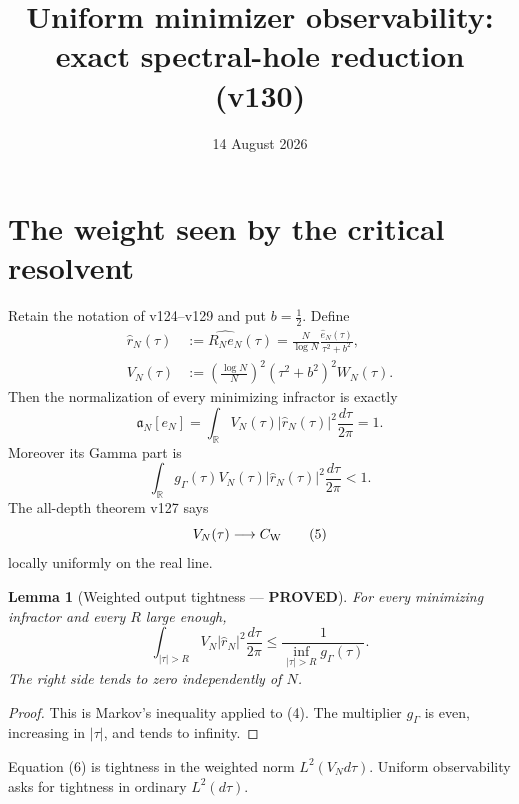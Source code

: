 \documentclass[11pt]{article}
\title{Uniform minimizer observability: exact spectral-hole reduction (v130)}
\date{14 August 2026}
\newcommand{\PROVED}{\textcolor{green!40!black}{\textbf{PROVED}}}
\newtheorem{lemma}{Lemma}
\begin{document}
\maketitle

\section{The weight seen by the critical resolvent}

Retain the notation of v124--v129 and put $b=\frac12$.  Define
\begin{align}
 \widehat r_N(\tau)
 &:=\widehat{R_Ne_N}(\tau)
   =\frac{N}{\log N}\frac{\widehat e_N(\tau)}{\tau^2+b^2},       \tag{1}\\
 V_N(\tau)
 &:=\left(\frac{\log N}{N}\right)^2
       (\tau^2+b^2)^2W_N(\tau).                                  \tag{2}
\end{align}
Then the normalization of every minimizing infractor is exactly
\begin{equation}
 \boxed{
 \mathfrak a_N[e_N]
 =\int_{\mathbb R}V_N(\tau)|\widehat r_N(\tau)|^2
       \frac{d\tau}{2\pi}=1.}                                   \tag{3}
\end{equation}
Moreover its Gamma part is
\begin{equation}
 \int_{\mathbb R}g_\Gamma(\tau)V_N(\tau)
       |\widehat r_N(\tau)|^2\frac{d\tau}{2\pi}<1.              \tag{4}
\end{equation}
The all-depth theorem v127 says
\begin{equation}
 V_N(\tau)\longrightarrow C_{\rm W}                              \tag{5}
\end{equation}
locally uniformly on the real line.

\begin{lemma}[Weighted output tightness --- \PROVED]
For every minimizing infractor and every $R$ large enough,
\begin{equation}
 \int_{|\tau|>R}V_N|\widehat r_N|^2\frac{d\tau}{2\pi}
 \le \frac1{\inf_{|\tau|>R}g_\Gamma(\tau)}.                    \tag{6}
\end{equation}
The right side tends to zero independently of $N$.
\end{lemma}

\begin{proof}
This is Markov's inequality applied to (4).  The multiplier
$g_\Gamma$ is even, increasing in $|\tau|$, and tends to infinity.
\end{proof}

Equation (6) is tightness in the weighted norm $L^2(V_Nd\tau)$.
Uniform observability asks for tightness in ordinary $L^2(d\tau)$.
\end{document}
